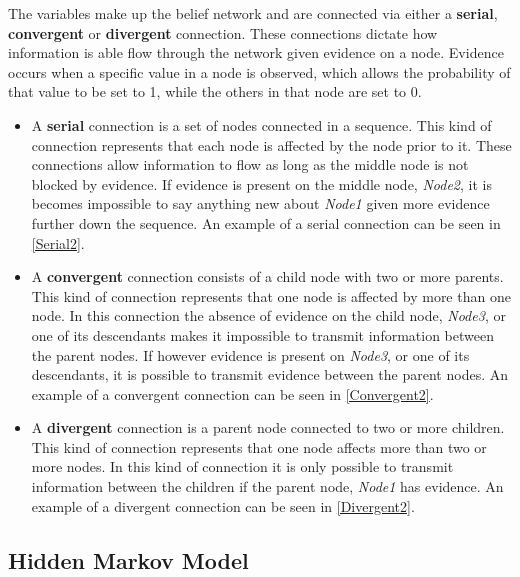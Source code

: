 The variables make up the belief network and are connected via either a
\textbf{serial}, \textbf{convergent} or \textbf{divergent} connection. These
connections dictate how information is able flow through the network given
evidence on a node. Evidence occurs when a specific value in a node is observed,
which allows the probability of that value to be set to 1, while the others in
that node are set to 0.
\begin{itemize}
  \item A \textbf{serial} connection is a set of nodes connected in a sequence.
  This kind of connection represents that each node is affected by the node
  prior to it. These connections allow information to flow as long as the middle
  node is not blocked by evidence. If evidence is present on the middle node,
  \textit{Node2}, it is becomes impossible to say anything new about
  \textit{Node1} given more evidence further down the sequence. An example of a
  serial connection can be seen in \autoref{Serial2}.
  \item A \textbf{convergent} connection consists of a child node with two or
  more parents. This kind of connection represents that one node is affected by
  more than one node. In this connection the absence of evidence on the child
  node, \textit{Node3}, or one of its descendants makes it impossible to
  transmit information between the parent nodes. If however evidence is present
  on \textit{Node3}, or one of its descendants, it is possible to transmit
  evidence between the parent nodes. An example of a convergent connection can
  be seen in \autoref{Convergent2}.
  \item A \textbf{divergent} connection is a parent node connected to two or
  more children. This kind of connection represents that one node affects more
  than two or more nodes. In this kind of connection it is only possible to
  transmit information between the children if the parent node, \textit{Node1}
  has evidence. An example of a divergent connection can be seen in
  \autoref{Divergent2}.
\end{itemize}



\subsection{Hidden Markov Model}

